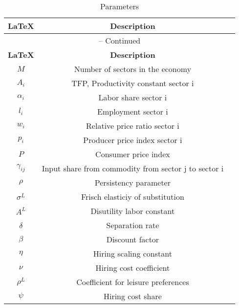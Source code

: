 \begin{center}
\begin{longtable}{ccc}
\caption{Parameters}\\%
\hline%
\multicolumn{1}{c}{\textbf{\LaTeX}} &
\multicolumn{1}{c}{\textbf{Description}}\\%
\hline\hline%
\endfirsthead
\multicolumn{3}{c}{{\tablename} \thetable{} -- Continued}\\%
\hline%
\multicolumn{1}{c}{\textbf{\LaTeX}} &
\multicolumn{1}{c}{\textbf{Description}}\\%
\hline\hline%
\endhead
${M}$ & Number of sectors in the economy\\
${A_{i}}$ & TFP, Productivity constant sector i\\
${\alpha_{i}}$ & Labor share sector i\\
${l_{i}}$ & Employment sector i\\
${w_{i}}$ & Relative price ratio sector i\\
${p_{i}}$ & Producer price index sector i\\
${P}$ & Consumer price index\\
${\gamma_{ij}}$ & Input share from commodity from sector j to sector i\\
${\rho}$ & Persistency parameter \\
${\sigma^{L}}$ & Frisch elasticiy of substitution\\
${A^{L}}$ & Disutility labor constant\\
${\delta}$ & Separation rate\\
${\beta}$ & Discount factor\\
${\eta}$ & Hiring scaling constant\\
${\nu}$ & Hiring cost coefficient\\
${\rho^{L}}$ & Coefficient for leisure preferences\\
${\psi}$ & Hiring cost share\\
\hline%
\end{longtable}
\label{tab: definitions}
\end{center}
